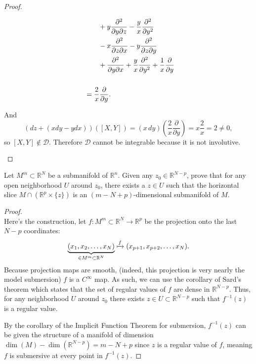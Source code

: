 \documentclass{article}
\newenvironment{problem}[2][Problem]{\begin{trivlist}
\item[\hskip \labelsep {\bfseries #1}\hskip \labelsep {\bfseries #2.}]}{\end{trivlist}}
\begin{document}
\begin{proof}
\begin{enumerate}[(a)]
\begin{align*}
        &\hspace{0.7cm}+ y\frac{\partial^2}{\partial y\partial z}
          - \frac{y}{x}\frac{\partial^2}{\partial y^2}\\
        &\hspace{0.7cm}-x\frac{\partial^2}{\partial z\partial x}
          -y\frac{\partial^2}{\partial z\partial y}\\
        &\hspace{0.7cm}+\frac{\partial^2}{\partial y\partial x}
          +\frac{y}{x}\frac{\partial^2}{\partial y^2}
          +\frac{1}{x}\frac{\partial}{\partial y} \\~\\
        &= \frac{2}{x}\frac{\partial}{\partial y}.
    \end{align*}

    And \[
      (dz + (xdy - ydx))([X, Y])
      = (x\,dy)\left(\frac{2}{x}\frac{\partial}{\partial y}\right)
      = x\frac{2}{x}
      = 2
      \not= 0,
    \] so $[X, Y] \not\in \mathcal{D}$.
    Therefore $\mathcal{D}$ cannot be integrable because it is not involutive.
  \end{enumerate}
\end{proof}

\pagebreak

\begin{problem}{3}
  Let $M^m \subset \mathbb{R}^N$ be a submanifold of $\mathbb{R}^n$. Given any
  $z_0 \in \mathbb{R}^{N - p}$, prove that for any open neighborhood $U$ around
  $z_0$, there exists a $z \in U$ such that the horizontal slice
  $M \cap (\mathbb{R}^p \times \{ z\})$ is an $(m-N+p)$-dimensional submanifold
  of $M$.
\end{problem}

\begin{proof} \text{}\\
  Here's the construction, let
  $f\colon M^m \subset \mathbb{R}^N \rightarrow \mathbb{R}^p$ be the projection
  onto the last $N-p$ coordinates: \[
    \underbrace{(x_1, x_2, \hdots, x_N)}_{\in M^m \subset \mathbb{R}^N}
    \xmapsto{f}
    (x_{p+1}, x_{p+2},\hdots, x_N).
  \]
  Because projection maps are smooth, (indeed, this projection is very nearly the
  model submersion) $f$ is a $C^\infty$ map. As such, we can use the corollary of
  Sard's theorem which states that the set of regular values of $f$ are dense in
  $\mathbb{R}^{N-p}$. Thus, for any neighborhood $U$ around $z_0$
  there exists $z \in U \subset \mathbb{R}^{N-p}$ such that $f^{-1}(z)$ is a
  regular value.

  By the corollary of the Implicit Function Theorem for submersion, $f^{-1}(z)$
  can be given the structure of a manifold of dimension
  $\dim(M) - \dim(\mathbb{R}^{N - p}) = m - N + p$
  since $z$ is a regular value of $f$, meaning $f$ is submersive at every
  point in $f^{-1}(z)$.
\end{proof}
\end{document}
